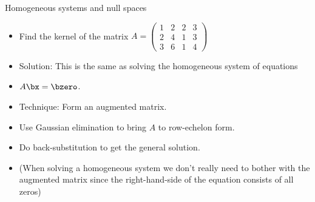 \documentclass{beamer}
\begin{document}
\begin{frame}{Homogeneous systems and null spaces}
\begin{itemize}
\item Find the kernel of the matrix
$A=
\begin{pmatrix}
1 & 2 & 2 & 3 \\
2 & 4 & 1 & 3 \\
3 & 6 & 1 & 4
\end{pmatrix}
$
\item Solution: This is the same as solving the homogeneous system of equations
\item $A\bx=\bzero$.
\item Technique: Form an augmented matrix.
\item Use Gaussian elimination to bring $A$ to row-echelon form.
\item Do back-substitution to get the general solution.
\item (When solving a homogeneous system we don't really need to bother with the
 augmented matrix since the right-hand-side
of the equation consists of all zeros)
\end{itemize}
\end{frame}
\end{document}
